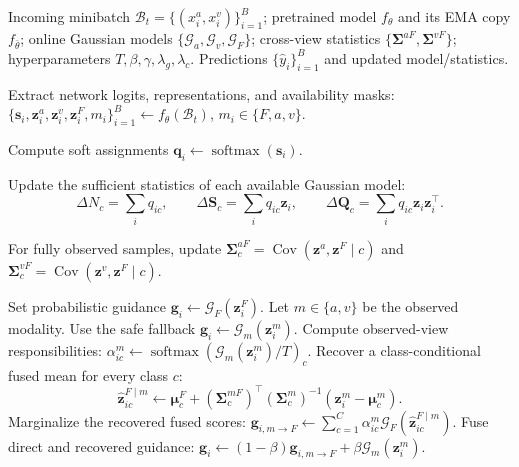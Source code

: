 \providecommand{\methodname}{AdaPGC+}

\begin{algorithm}[t]
\caption{Online Adaptation Procedure of \methodname}
\label{alg:adapgc}
\begin{algorithmic}[1]
\Require Incoming minibatch
$\mathcal{B}_t=\{(x_i^a,x_i^v)\}_{i=1}^{B}$;
pretrained model $f_{\theta}$ and its EMA copy $f_{\bar\theta}$;
online Gaussian models $\{\mathcal{G}_a,\mathcal{G}_v,\mathcal{G}_F\}$;
cross-view statistics $\{\bm\Sigma^{aF},\bm\Sigma^{vF}\}$;
hyperparameters $T,\beta,\gamma,\lambda_g,\lambda_c$.
\Ensure Predictions $\{\widehat y_i\}_{i=1}^{B}$ and updated model/statistics.

\State Extract network logits, representations, and availability masks:
\Statex \hfill
$\{\bm s_i,\bm z_i^a,\bm z_i^v,\bm z_i^F,
m_i\}_{i=1}^{B}\gets f_{\theta}(\mathcal{B}_t)$,
$m_i\in\{F,a,v\}$.

\State Compute soft assignments
$\bm q_i\gets\operatorname{softmax}(\bm s_i)$.

\State Update the sufficient statistics of each available Gaussian model:
\Statex
\[
\Delta N_c=\sum_i q_{ic},\qquad
\Delta\bm S_c=\sum_iq_{ic}\bm z_i,\qquad
\Delta\bm Q_c=\sum_iq_{ic}\bm z_i\bm z_i^{\top}.
\]

\State For fully observed samples, update
$\bm\Sigma_c^{aF}=\operatorname{Cov}(\bm z^a,\bm z^F\mid c)$ and
$\bm\Sigma_c^{vF}=\operatorname{Cov}(\bm z^v,\bm z^F\mid c)$.

    \State Set probabilistic guidance
    $\bm g_i\gets\mathcal{G}_F(\bm z_i^F)$.
  \Else
    \State Let $m\in\{a,v\}$ be the observed modality.
      \State Use the safe fallback
      $\bm g_i\gets\mathcal{G}_m(\bm z_i^m)$.
    \Else
      \State Compute observed-view responsibilities:
      \Statex \hfill
      $\alpha_{ic}^{m}\gets
      \operatorname{softmax}\!\left(\mathcal{G}_m(\bm z_i^m)/T\right)_c$.
      \State Recover a class-conditional fused mean for every class $c$:
      \Statex
      \[
      \widehat{\bm z}_{ic}^{F\mid m}\gets
      \bm\mu_c^F+(\bm\Sigma_c^{mF})^{\top}
      (\bm\Sigma_c^m)^{-1}(\bm z_i^m-\bm\mu_c^m).
      \]
      \State Marginalize the recovered fused scores:
      \Statex \hfill
      $\bm g_{i,m\rightarrow F}\gets
      \sum_{c=1}^{C}\alpha_{ic}^{m}
      \mathcal{G}_F(\widehat{\bm z}_{ic}^{F\mid m})$.
      \State Fuse direct and recovered guidance:
      \Statex \hfill
      $\bm g_i\gets(1-\beta)\bm g_{i,m\rightarrow F}
      +\beta\mathcal{G}_m(\bm z_i^m)$.
    \EndIf
  \EndIf
\EndFor


\end{algorithmic}
\end{algorithm}
